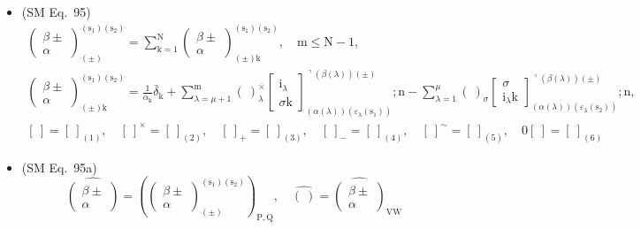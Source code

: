 \documentclass[12pt]{article}
\begin{document}
\begin{itemize}[label={},leftmargin=0pt]
    \item (SM Eq.\ 95) 
    \[
    \begin{gathered}
    \left( \begin{smallmatrix} \beta \pm \\ \alpha \end{smallmatrix} \right)^{(\mathrm{s_1})(\mathrm{s_2})}_{(\pm)} = \sum_{\mathrm{k}=1}^\mathrm{N} \left( \begin{smallmatrix} \beta \pm \\ \alpha \end{smallmatrix} \right)^{(\mathrm{s_1})(\mathrm{s_2})}_{(\pm)\mathrm{k}}, \quad \mathrm{m} \le \mathrm{N}-1, \\
    \left( \begin{smallmatrix} \beta \pm \\ \alpha \end{smallmatrix} \right)^{(\mathrm{s_1})(\mathrm{s_2})}_{(\pm)\mathrm{k}} = \frac{1}{\alpha_\mathrm{k}} \bar{\delta}_\mathrm{k} + \sum_{\lambda=\mu+1}^\mathrm{m} (\ )^{\bar{\times}}_\lambda \left[ \begin{smallmatrix} \mathrm{i}_\lambda \\ \sigma \mathrm{k} \end{smallmatrix} \right]^{\urcorner(\beta(\lambda))(\pm)}_{(\alpha(\lambda))(\varepsilon_\lambda(\mathrm{s_1}))} ; \mathrm{n} - \sum_{\lambda=1}^\mu (\ )_\sigma \left[ \begin{smallmatrix} \sigma \\ \mathrm{i}_\lambda \mathrm{k} \end{smallmatrix} \right]^{\urcorner(\beta(\lambda))(\pm)}_{(\alpha(\lambda))(\varepsilon_\lambda(\mathrm{s_2}))} ; \mathrm{n}, \\
    [ \ ] = [ \ ]_{(1)}, \quad [ \ ]^\times = [ \ ]_{(2)}, \quad [ \ ]_+ = [ \ ]_{(3)}, \quad [ \ ]_- = [ \ ]_{(4)}, \quad [ \ ]^\sim = [ \ ]_{(5)}, \quad 0[ \ ] = [ \ ]_{(6)}
    \end{gathered}
    \]

    \item (SM Eq.\ 95a) 
    \[
    \widehat{\left( \begin{smallmatrix} \beta \pm \\ \alpha \end{smallmatrix} \right)} = \left( \left( \begin{smallmatrix} \beta \pm \\ \alpha \end{smallmatrix} \right)^{(\mathrm{s}_1)(\mathrm{s}_2)}_{(\pm)} \right)_{\mathrm{P,Q}}, \quad \widehat{(\ )} = \widehat{\left( \begin{smallmatrix} \beta \pm \\ \alpha \end{smallmatrix} \right)}_{\mathrm{VW}}
    \]


\end{itemize}
\end{document}
